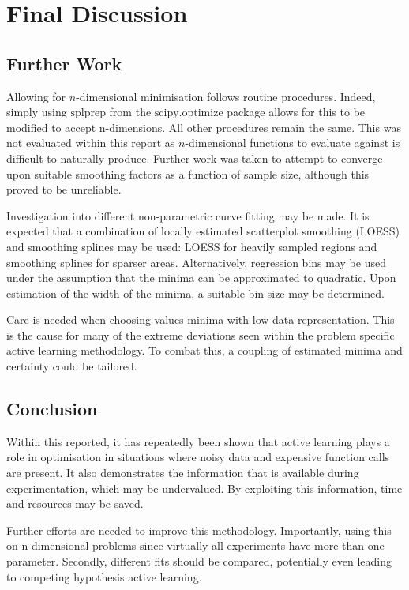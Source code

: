 \chapter{Final Discussion}

\ifpdf
    \graphicspath{{Chapter3/Figs/Raster/}{Chapter3/Figs/PDF/}{Chapter3/Figs/}}
\else
    \graphicspath{{Chapter3/Figs/Vector/}{Chapter3/Figs/}}
\fi

\section{Further Work}
Allowing for $n$-dimensional minimisation follows routine procedures. Indeed, simply using $\text{splprep}$ from the $\text{scipy.optimize}$ package allows for this to be modified to accept n-dimensions. All other procedures remain the same. This was not evaluated within this report as $n$-dimensional functions to evaluate against is difficult to naturally produce. Further work was taken to attempt to converge upon suitable smoothing factors as a function of sample size, although this proved to be unreliable.

Investigation into different non-parametric curve fitting may be made. It is expected that a combination of locally estimated scatterplot smoothing (LOESS) and smoothing splines may be used: LOESS for heavily sampled regions and smoothing splines for sparser areas. Alternatively, regression bins may be used under the assumption that the minima can be approximated to quadratic. Upon estimation of the width of the minima, a suitable bin size may be determined.

Care is needed when choosing values minima with low data representation. This is the cause for many of the extreme deviations seen within the problem specific active learning methodology. To combat this, a coupling of estimated minima and certainty could be tailored. 

\section{Conclusion}
Within this reported, it has repeatedly been shown that active learning plays a role in optimisation in situations where noisy data and expensive function calls are present. It also demonstrates the information that is available during experimentation, which may be undervalued. By exploiting this information, time and resources may be saved.

Further efforts are needed to improve this methodology. Importantly, using this on n-dimensional problems since virtually all experiments have more than one parameter. Secondly, different fits should be compared, potentially even leading to competing hypothesis active learning.